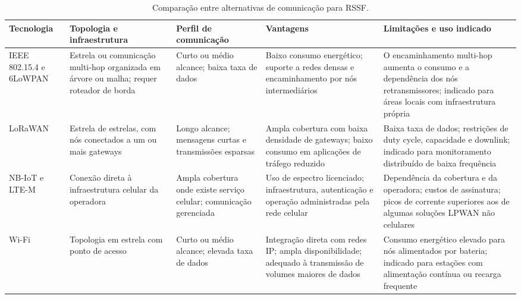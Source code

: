 \begin{table}[!t]
\centering
\caption{Comparação entre alternativas de comunicação para RSSF.}
\label{tab:alternativas_comunicacao}
\footnotesize
\setlength{\tabcolsep}{4pt}
\renewcommand{\arraystretch}{1.18}

\begin{tabularx}{\textwidth}{
    @{}
    L{2.0cm}
    L{3.4cm}
    L{3.1cm}
    Y
    Y
    @{}
}
\toprule
\textbf{Tecnologia} &
\textbf{Topologia e infraestrutura} &
\textbf{Perfil de comunicação} &
\textbf{Vantagens} &
\textbf{Limitações e uso indicado} \\
\midrule

IEEE 802.15.4 e 6LoWPAN
\cite{YICK20082292} &
Estrela ou comunicação multi-hop organizada em árvore ou malha; requer roteador de borda &
Curto ou médio alcance; baixa taxa de dados &
Baixo consumo energético; suporte a redes densas e encaminhamento por nós intermediários &
O encaminhamento multi-hop aumenta o consumo e a dependência dos nós retransmissores; indicado para áreas locais com infraestrutura própria \\

\addlinespace

LoRaWAN
\cite{7815384,8030482,s23208440} &
Estrela de estrelas, com nós conectados a um ou mais gateways &
Longo alcance; mensagens curtas e transmissões esparsas &
Ampla cobertura com baixa densidade de gateways; baixo consumo em aplicações de tráfego reduzido &
Baixa taxa de dados; restrições de duty cycle, capacidade e downlink; indicado para monitoramento distribuído de baixa frequência \\

\addlinespace

NB-IoT e LTE-M
\cite{7815384} &
Conexão direta à infraestrutura celular da operadora &
Ampla cobertura onde existe serviço celular; comunicação gerenciada &
Uso de espectro licenciado; infraestrutura, autenticação e operação administradas pela rede celular &
Dependência da cobertura e da operadora; custos de assinatura; picos de corrente superiores aos de algumas soluções LPWAN não celulares \\

\addlinespace

Wi-Fi
\cite{YICK20082292} &
Topologia em estrela com ponto de acesso &
Curto ou médio alcance; elevada taxa de dados &
Integração direta com redes IP; ampla disponibilidade; adequado à transmissão de volumes maiores de dados &
Consumo energético elevado para nós alimentados por bateria; indicado para estações com alimentação contínua ou recarga frequente \\

\bottomrule
\end{tabularx}
\end{table}